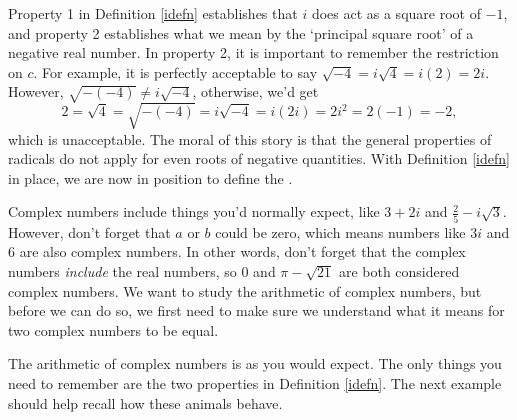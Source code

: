 
Property 1 in Definition \ref{idefn} establishes that $i$ does act as a square root of $-1$, and property 2 establishes what we mean by the `principal square root' of a negative real number.  In property 2, it is important to remember the restriction on $c$.  For example, it is perfectly acceptable to say  $\sqrt{-4} = i \sqrt{4} = i(2) = 2i$. However, $\sqrt{-(-4)} \neq i \sqrt{-4}$, otherwise, we'd get\[ 2 = \sqrt{4} = \sqrt{-(-4)} = i \sqrt{-4} = i (2i) = 2i^2 = 2(-1) = -2,\] which is unacceptable. The moral of this story is that the general properties of radicals do not apply for even roots of negative quantities.  With Definition \ref{idefn} in place, we are now in position to define the .

\medskip


\medskip

Complex numbers include things you'd normally expect, like $3+2i$ and $\frac{2}{5} - i\sqrt{3}$.  However, don't forget that $a$ or $b$ could be zero, which means numbers like $3i$ and $6$ are also complex numbers.  In other words, don't forget that the complex numbers \textit{include} the real numbers, so $0$ and $\pi - \sqrt{21}$ are both considered complex numbers. We want to study the arithmetic of complex numbers, but before we can do so, we first need to make sure we understand what it means for two complex numbers to be equal.

\smallskip


\smallskip

The arithmetic of complex numbers is as you would expect.  The only things you need to remember are the two properties in Definition \ref{idefn}.  The next example should help recall how these animals behave.

